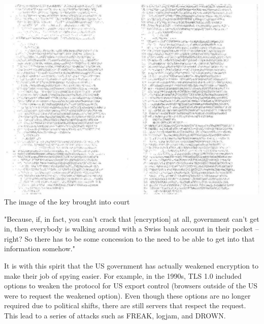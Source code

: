 \documentclass[11pt]{article} %
\begin{document}
\begin{center}
\includegraphics[scale=.3]{./lavabit-blurry-key.png}
\\The image of the key brought into court
\end{center}

{\parindent0pt "Because, if, in fact, you can’t crack that [encryption] at all,
government can’t get in, then everybody is walking around with a Swiss bank 
account in their pocket – right? So there has to be some concession to the need
to be able to get into that information somehow."}


{\parindent0pt It is with this spirit that the US government has actually 
weakened encryption to make their job of spying easier. For example, in the 
1990s, TLS 1.0 included options to weaken the protocol for US export control 
(browsers outside of the US were to request the weakened option). Even though 
these options are no longer required due to political shifts, there are still 
servers that respect the request. This lead to a series of attacks such as 
FREAK, logjam, and DROWN.}
\end{document}
